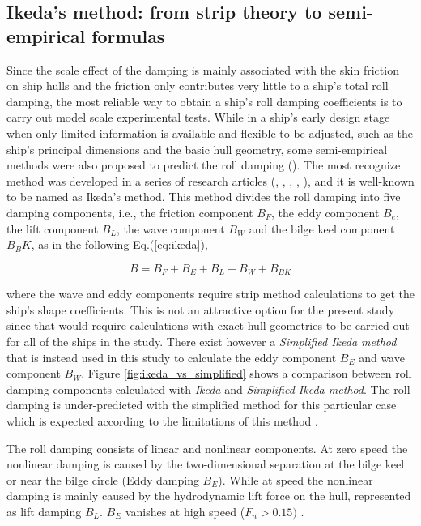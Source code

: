 
\subsection{Ikeda's method: from strip theory to semi-empirical formulas}
\label{se:semi-empirical methods}
Since the scale effect of the damping is mainly associated with the skin friction on ship hulls and the friction only contributes very little to a ship's total roll damping, the most reliable way to obtain a ship's roll damping coefficients is to carry out model scale experimental tests. 
While in a ship's early design stage when only limited information is available and flexible to be adjusted, such as the ship's principal dimensions and the basic hull geometry, some semi-empirical methods were also proposed to predict the roll damping (\parencite{himeno_prediction_1981}). The most recognize method was developed in a series of research articles (\parencite{ikeda_roll_1978}, \parencite{ikeda_eddy_1978}, \parencite{ikeda_roll_1979}, \parencite{ikeda_components_1978}, \parencite{ikeda_velocity_1979}), and it is well-known to be named as Ikeda's method. This method divides the roll damping into five damping components, i.e., the friction component $B_F$, the eddy component $B_e$, the lift component $B_L$, the wave component $B_W$ and the bilge keel component $B_BK$, as in the following Eq.(\ref{eq:ikeda}), 

\begin{equation} \label{eq:ikeda}
B = B_F + B_E + B_L + B_W + B_{BK}
\end{equation}

where the wave and eddy components require strip method calculations to get the ship's shape coefficients. This is not an attractive option for the present study since that would require calculations with exact hull geometries to be carried out for all of the ships in the study. There exist however a \emph{Simplified Ikeda method} \parencite{kawahara_simple_2011} that is instead used in this study to calculate the eddy component $B_E$ and wave component $B_W$. Figure \ref{fig:ikeda_vs_simplified} shows a comparison between roll damping components calculated with \emph{Ikeda} and \emph{Simplified Ikeda method}. The roll damping is under-predicted with the simplified method for this particular case which is expected according to the limitations of this method  \parencite{kawahara_simple_2011}.



The roll damping consists of linear and nonlinear components. At zero speed the nonlinear damping is caused by the two-dimensional separation at the bilge keel or near the bilge circle (Eddy damping $B_E$). While at speed the nonlinear damping is mainly caused by the hydrodynamic lift force on the hull, represented as lift damping $B_L$. $B_E$ vanishes at high speed ($F_n>0.15)$ \parencite{ikeda_components_1978}.

